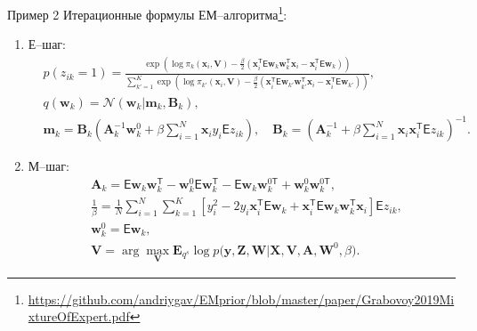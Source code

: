 \documentclass[9pt,pdf,hyperref={unicode}]{beamer}
\begin{document}
\begin{frame}{Пример 2}
\justifying
Итерационные формулы ЕМ--алгоритма\footnote[1]{\url{https://github.com/andriygav/EMprior/blob/master/paper/Grabovoy2019MixtureOfExpert.pdf}}:
	\begin{enumerate}
		\item Е--шаг: 
			\begin{equation}
			\label{sl:7:eq:1}
				\begin{aligned}
					&p\left(z_{ik} = 1\right) = \frac{\exp\left(\log\pi_{k}\left(\textbf{x}_{i}, \textbf{V}\right) - \frac{\beta}{2}\left(\textbf{x}_{i}^{\mathsf{T}}\mathsf{E}\textbf{w}_{k}\textbf{w}_{k}^{\mathsf{T}}\textbf{x}_{i} - \textbf{x}_{i}^{\mathsf{T}}\mathsf{E}\textbf{w}_{k}\right)\right)}{\sum_{k'=1}^{K}\exp\left(\log\pi_{k'}\left(\textbf{x}_{i}, \textbf{V}\right) - \frac{\beta}{2}\left(\textbf{x}_{i}^{\mathsf{T}}\mathsf{E}\textbf{w}_{k'}\textbf{w}_{k'}^{\mathsf{T}}\textbf{x}_{i} - \textbf{x}_{i}^{\mathsf{T}}\mathsf{E}\textbf{w}_{k'}\right) \right)},\\
					&q(\textbf{w}_k) = \mathcal{N}(\textbf{w}_k|\textbf{m}_k, \textbf{B}_k),\\
					&\mathbf{m}_{k} = \mathbf{B}_{k}\left(\mathbf{A}_{k}^{-1}\mathbf{w}_{k}^{0}+\beta\sum_{i=1}^{N}\mathbf{x}_{i}y_{i}\mathsf{E}z_{ik}\right), \quad
					\mathbf{B}_{k} = \left(\mathbf{A}_{k}^{-1}+\beta\sum_{i=1}^{N}\mathbf{x}_{i}\mathbf{x}_{i}^{\mathsf{T}}\mathsf{E}z_{ik}\right)^{-1} .
				\end{aligned}
			\end{equation}
		\item М--шаг: 
			\begin{equation}
			\label{sl:7:eq:2}
				\begin{aligned}
					&\textbf{A}_{k} = \mathsf{E}\textbf{w}_{k}\textbf{w}_{k}^{\mathsf{T}} - \textbf{w}_{k}^{0}\mathsf{E}\textbf{w}_{k}^{\mathsf{T}} - \mathsf{E}\textbf{w}_{k}\textbf{w}_{k}^{0\mathsf{T}} + \textbf{w}_{k}^{0}\textbf{w}_{k}^{0\mathsf{T}}, \\
					 &\frac{1}{\beta}=\frac{1}{N}\sum_{i=1}^{N}\sum_{k=1}^{K}\left[y_{i}^{2}-2y_{i}\textbf{x}_{i}^{\mathsf{T}}\mathsf{E}\textbf{w}_{k} + \textbf{x}_{i}^{\mathsf{T}}\mathsf{E}\textbf{w}_{k}\textbf{w}_{k}^{\mathsf{T}}\textbf{x}_{i}\right]\mathsf{E}z_{ik},\\
					&\textbf{w}_{k}^{0} =\mathsf{E}\textbf{w}_{k},\\
					&\textbf{V}= \arg\max_{\textbf{V}} \mathbf{E}_{q^{s}}\log p\bigr(\mathbf{y}, \textbf{Z},\mathbf{W}|\mathbf{X}, \mathbf{V}, \textbf{A}, \textbf{W}^{0}, \beta\bigr).
				\end{aligned}
			\end{equation}
	\end{enumerate}
\end{frame}
\end{document}
